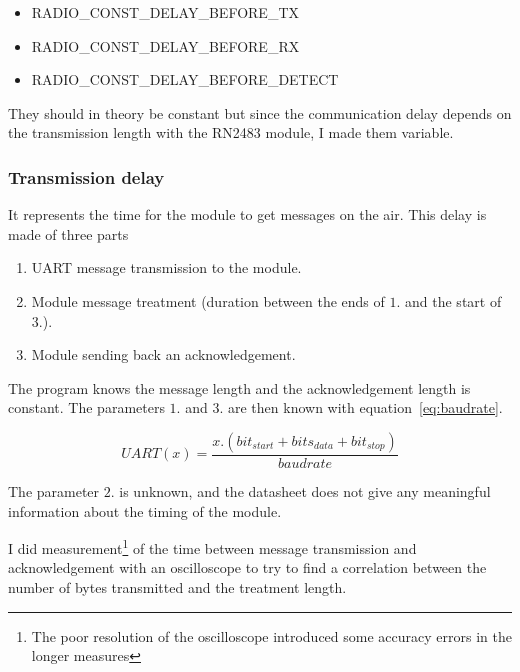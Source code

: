 \begin{itemize}
  \item RADIO\_CONST\_DELAY\_BEFORE\_TX
  \item RADIO\_CONST\_DELAY\_BEFORE\_RX
  \item RADIO\_CONST\_DELAY\_BEFORE\_DETECT
\end{itemize}

They should in theory be constant but since the communication delay depends
on the transmission length with the RN2483 module, I made them variable.


\subsubsection{Transmission delay}

It represents the time for the module to get messages on the air.
This delay is made of three parts

\begin{enumerate}
  \item UART message transmission to the module.
  \item Module message treatment (duration between the ends of $1.$ and the start of $3.$).
  \item Module sending back an acknowledgement.
\end{enumerate}

The program knows the message length and the acknowledgement length is constant.
The parameters $1.$ and $3.$ are then known with equation~\ref{eq:baudrate}.

\begin{equation}
  \label{eq:baudrate}
  UART(x) = \frac{x . (bit_{start} + bits_{data} + bit_{stop})}{baudrate}
\end{equation}

The parameter $2.$ is unknown, and the datasheet does not give any meaningful
information about the timing of the module.

I did measurement\footnote{The poor resolution of the oscilloscope introduced
some accuracy errors in the longer measures} of the time between message
transmission and acknowledgement with an oscilloscope to try to find a
correlation between the number of bytes transmitted and the treatment length.


